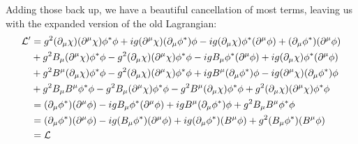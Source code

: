 \newpage
Adding those back up, we have a beautiful cancellation of most terms, leaving us with the expanded version of the old Lagrangian:
\begin{align*}
    \mathcal{L}' &= g^2(\partial_\mu\chi)(\partial^\mu \chi) \phi^* \phi + ig(\partial^\mu \chi)(\partial_\mu \phi^*) \phi -ig(\partial_\mu\chi)\phi^*(\partial^\mu \phi) +(\partial_\mu \phi^*)(\partial^\mu \phi) \\
    &+ g^2 B_\mu (\partial^\mu \chi)\phi^*\phi - g^2(\partial_\mu \chi)(\partial^\mu \chi)\phi^*\phi - ig B_\mu \phi^*(\partial^\mu\phi) + ig(\partial_\mu \chi)\phi^*(\partial^\mu\phi) \\
    &+ g^2B^\mu(\partial_\mu \chi)\phi^*\phi - g^2(\partial_\mu \chi)(\partial^\mu \chi)\phi^*\phi + igB^\mu(\partial_\mu \phi^*)\phi - ig(\partial^\mu \chi)(\partial_\mu \phi^*)\phi \\
    &+ g^2B_\mu B^\mu \phi^*\phi - g^2B_\mu(\partial^\mu \chi)\phi^*\phi - g^2B^\mu(\partial_\mu \chi)\phi^*\phi + g^2(\partial_\mu \chi)(\partial^\mu \chi)\phi^*\phi \\
    &= (\partial_\mu\phi^*)(\partial^\mu\phi) - igB_\mu\phi^*(\partial^\mu\phi) + igB^\mu(\partial_\mu\phi^*)\phi + g^2B_\mu B^\mu\phi^*\phi \\
    &= (\partial_\mu\phi^*)(\partial^\mu\phi) - ig (B_\mu\phi^*) (\partial^\mu\phi) + ig(\partial_\mu\phi^*)(B^\mu\phi) + g^2(B_\mu\phi^*) (B^\mu\phi) \\
    &= \mathcal{L} \\
\end{align*}
